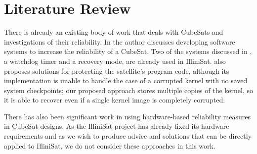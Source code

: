 \section{Literature Review}

There is already an existing body of work that deals with CubeSats and
investigations of their reliability.  In \cite{odegaard2013error} the author
discusses developing software systems to increase the reliability of a CubeSat.
Two of the systems discussed in \cite{odegaard2013error}, a watchdog timer and a
recovery mode, are already used in IlliniSat.  \cite{odegaard2013error} also
proposes solutions for protecting the satellite's program code, although its
implementation is unable to handle the case of a corrupted kernel with no saved
system checkpoints; our proposed approach stores multiple copies of the kernel,
so it is able to recover even if a single kernel image is completely corrupted.

There has also been significant work in using hardware-based reliability measures in CubeSat designs.  As the IlliniSat project has already fixed its hardware requirements and as we wish to produce advice and solutions that can be directly applied to IlliniSat, we do not consider these approaches in this work.

